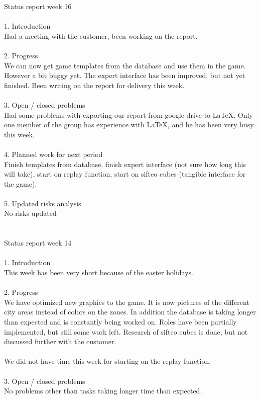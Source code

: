 Status report week 16\\
\\
1. Introduction\\
Had a meeting with the customer, been working on the report.\\
\\
2. Progress\\
We can now get game templates from the database and use them in the game. However a bit buggy yet. The expert interface has been improved, but not yet finished. Been writing on the report for delivery this week. \\
\\
3. Open / closed problems\\
Had some problems with exporting our report from google drive to LaTeX. Only one member of the group has experience with LaTeX, and he has been very busy this week. \\
\\
4. Planned work for next period\\
Finish templates from database, finish expert interface (not sure how long this will take), start on replay function, start on sifteo cubes (tangible interface for the game). \\
\\
5. Updated risks analysis\\
No risks updated\\
\\
\\
Status report week 14\\
\\
1. Introduction\\
This week has been very short because of the easter holidays. \\
\\
2. Progress\\
We have optimized new graphics to the game. It is now pictures of the different city areas instead of colors on the zones. In addition the database is taking longer than expected and is constantly being worked on. Roles have been partially implemented, but still some work left. Research of sifteo cubes is done, but not discussed further with the customer. \\
\\
We did not have time this week for starting on the replay function.\\
\\
3. Open / closed problems\\
No problems other than tasks taking longer time than expected. \\
